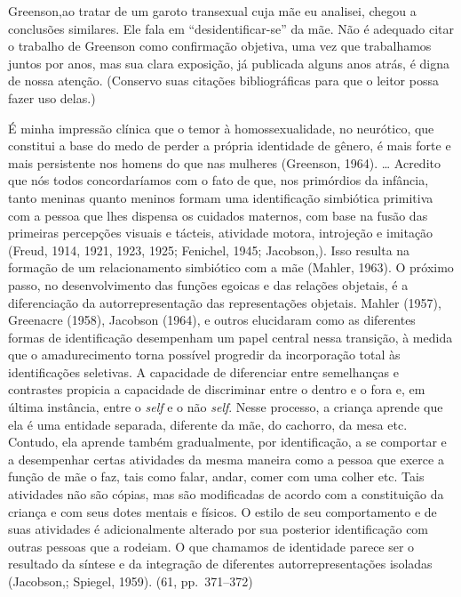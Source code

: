 Greenson,\idxgrens[|(] ao tratar de um garoto transexual cuja mãe eu analisei,
chegou a conclusões similares. Ele fala em
``desidentificar-se'' da mãe. Não é adequado
citar o trabalho de Greenson como confirmação objetiva, uma vez que
trabalhamos juntos por anos, mas sua clara exposição, já publicada
alguns anos atrás, é digna de nossa atenção. (Conservo suas citações
bibliográficas para que o leitor possa fazer uso delas.)

É minha impressão clínica que o temor à homossexualidade, no
neurótico, que constitui a base do medo de perder a própria identidade
de gênero,\idxiden{} é mais forte e mais persistente nos homens do que nas
mulheres (Greenson, 1964). \ldots{} Acredito que nós todos concordaríamos
com o fato de que, nos primórdios da infância, tanto meninas quanto
meninos formam uma identificação simbiótica primitiva\idxpaisiden{} com a pessoa que
lhes dispensa os cuidados maternos, com base na fusão das primeiras
percepções visuais e tácteis, atividade motora, introjeção e imitação
(Freud,\idxfreud{} 1914, 1921, 1923, 1925; Fenichel,\idxfenic{} 1945; Jacobson,). Isso
resulta na formação de um relacionamento simbiótico com a mãe\idxidentsimb{} (Mahler,\idxmahle{}
1963). O próximo passo, no desenvolvimento das funções\idxegoi{} egoicas\idxinfanego{} e das
relações objetais, é a diferenciação da autorrepresentação das
representações objetais. Mahler\idxmahle{} (1957), Greenacre\idxgrena{} (1958), Jacobson
(1964), e outros elucidaram como as diferentes formas de identificação
desempenham um papel central nessa transição, à medida que o
amadurecimento torna possível progredir da incorporação total às
identificações seletivas. A capacidade de diferenciar entre semelhanças
e contrastes propicia a capacidade de discriminar entre o dentro e o
fora e, em última instância, entre o \textit{self} e o não \textit{self}. Nesse
processo, a criança aprende que ela é uma entidade separada, diferente
da mãe, do cachorro, da mesa etc. Contudo, ela aprende também
gradualmente, por identificação, a se comportar e a desempenhar certas
atividades da mesma maneira como a pessoa que exerce a função de mãe o
faz, tais como falar, andar, comer com uma colher etc. Tais atividades
não são cópias, mas são modificadas de acordo com a constituição da
criança e com seus dotes mentais e físicos. O estilo de seu
comportamento e de suas atividades é adicionalmente alterado por sua
posterior identificação com outras pessoas que a rodeiam. O que
chamamos de identidade parece ser o resultado da síntese e da
integração de diferentes autorrepresentações isoladas (Jacobson,;
Spiegel, 1959). (61, pp.~371--372)


